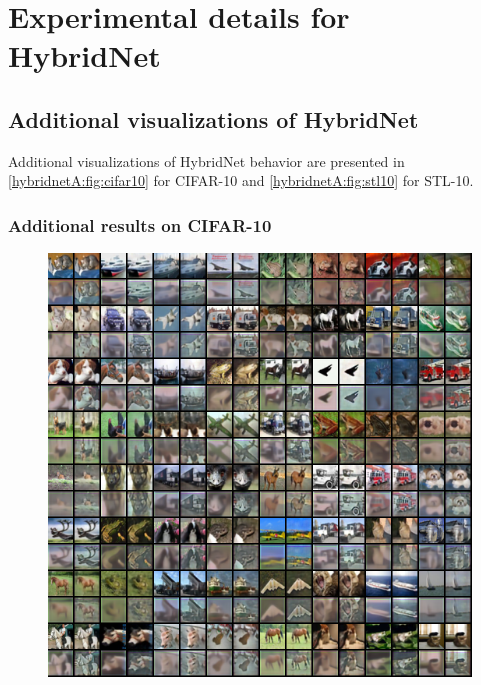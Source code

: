 \chapter{Experimental details for HybridNet}
\label{chapter:hybridnetA}


\minitoc
{}

\section{Additional visualizations of HybridNet}

Additional visualizations of HybridNet behavior are presented in \autoref{hybridnetA:fig:cifar10} for CIFAR-10 and \autoref{hybridnetA:fig:stl10} for STL-10.

\newpage
\subsection{Additional results on CIFAR-10}

\begin{figure}[h]
	\centering
    \includegraphics[width=\textwidth]{images/hybridnet_cifar10}
    \label{hybridnetA:fig:cifar10}
\end{figure}

